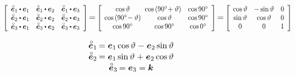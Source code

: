 \begin{figure}[!htbp]
\begin{center}
\begin{tikzpicture}[scale=4, tdplot_main_coords]
\end{tikzpicture}
\end{center}

\vspace{-1em}\[
\scalebox{0.8}[0.85]{$\left[ \begin{array}{ccc}
\mathcircabove{\bm{e}}_1 \dotp \bm{e}_1 & \mathcircabove{\bm{e}}_1 \dotp \bm{e}_2 & \mathcircabove{\bm{e}}_1 \dotp \bm{e}_3 \\
\mathcircabove{\bm{e}}_2 \dotp \bm{e}_1 & \mathcircabove{\bm{e}}_2 \dotp \bm{e}_2 & \mathcircabove{\bm{e}}_2 \dotp \bm{e}_3 \\
\mathcircabove{\bm{e}}_3 \dotp \bm{e}_1 & \mathcircabove{\bm{e}}_3 \dotp \bm{e}_2 & \mathcircabove{\bm{e}}_3 \dotp \bm{e}_3
\end{array} \right]$} \hspace{-0.32ex} = \hspace{-0.2ex}
%
\scalebox{0.8}[0.85]{$\left[ \hspace{-0.2ex} \begin{array}{ccc}
\operatorname{cos} \vartheta & \hspace{-1ex} \operatorname{cos} \left( 90\degree \!+ \vartheta \right) & \operatorname{cos} 90\degree \\
\operatorname{cos} \left( 90\degree \!- \vartheta \right) & \operatorname{cos} \vartheta & \operatorname{cos} 90\degree \\
\operatorname{cos} 90\degree & \operatorname{cos} 90\degree & \operatorname{cos} 0\degree
\end{array} \right]$} \hspace{-0.32ex} = \hspace{-0.2ex}
%
\scalebox{0.8}[0.85]{$\left[ \hspace{-0.1ex} \begin{array}{ccc}
\operatorname{cos} \vartheta & - \operatorname{sin} \vartheta & 0 \\
\operatorname{sin} \vartheta & \operatorname{cos} \vartheta & 0 \\
0 & 0 & 1
\end{array} \right]$}
\]

\vspace{-0.8em}
\[\begin{array}{c}
\mathcircabove{\bm{e}}_1 \hspace{-0.16ex} = \bm{e}_1 \operatorname{cos} \vartheta \hspace{0.1ex} - \hspace{0.1ex} \bm{e}_2 \operatorname{sin} \vartheta \\[0.1em]
\mathcircabove{\bm{e}}_2 \hspace{-0.16ex} = \bm{e}_1 \operatorname{sin} \vartheta \hspace{0.1ex} + \hspace{0.1ex} \bm{e}_2 \operatorname{cos} \vartheta \\[0.1em]
\mathcircabove{\bm{e}}_3 \hspace{-0.16ex} = \bm{e}_3 = \bm{k}
\end{array}\]


\end{figure}
